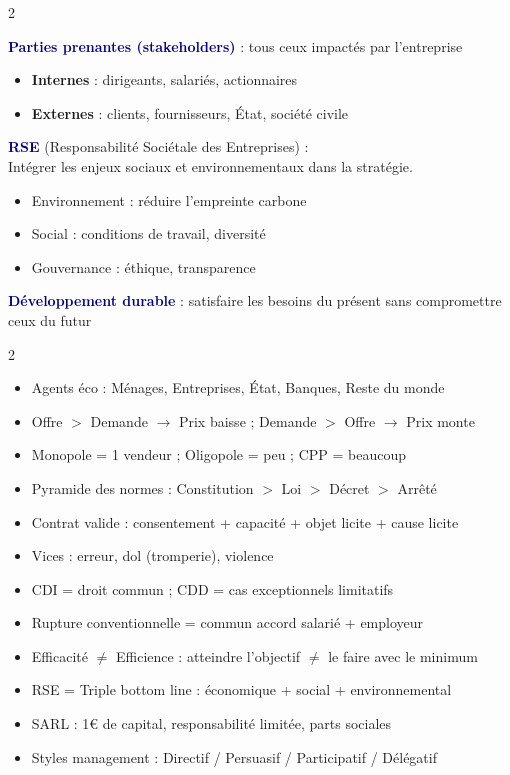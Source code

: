 \documentclass[a4paper,10pt]{article}
\newcommand{\key}[1]{\textbf{\textcolor{darkblue}{#1}}}
\begin{document}
\begin{multicols}{2}
\begin{tcolorbox}[basebox, colframe=purple, title=10. MANAGEMENT — Parties prenantes et RSE]
\key{Parties prenantes (stakeholders)} : tous ceux impactés par l'entreprise
\begin{itemize}
  \item \textbf{Internes} : dirigeants, salariés, actionnaires
  \item \textbf{Externes} : clients, fournisseurs, État, société civile
\end{itemize}
\vspace{4pt}
\key{RSE} (Responsabilité Sociétale des Entreprises) :\\
Intégrer les enjeux sociaux et environnementaux dans la stratégie.
\begin{itemize}
  \item Environnement : réduire l'empreinte carbone
  \item Social : conditions de travail, diversité
  \item Gouvernance : éthique, transparence
\end{itemize}
\vspace{4pt}
\key{Développement durable} : satisfaire les besoins du présent sans compromettre ceux du futur
\end{tcolorbox}

\end{multicols}

\vspace{4pt}
\begin{tcolorbox}[basebox, colframe=darkblue, title=Points clés à retenir pour l'examen CEJM]
\begin{multicols}{2}
\begin{itemize}
  \item Agents éco : Ménages, Entreprises, État, Banques, Reste du monde
  \item Offre $>$ Demande $\to$ Prix baisse ; Demande $>$ Offre $\to$ Prix monte
  \item Monopole = 1 vendeur ; Oligopole = peu ; CPP = beaucoup
  \item Pyramide des normes : Constitution $>$ Loi $>$ Décret $>$ Arrêté
  \item Contrat valide : consentement + capacité + objet licite + cause licite
  \item Vices : erreur, dol (tromperie), violence
  \item CDI = droit commun ; CDD = cas exceptionnels limitatifs
  \item Rupture conventionnelle = commun accord salarié + employeur
  \item Efficacité $\neq$ Efficience : atteindre l'objectif $\neq$ le faire avec le minimum
  \item RSE = Triple bottom line : économique + social + environnemental
  \item SARL : 1€ de capital, responsabilité limitée, parts sociales
  \item Styles management : Directif / Persuasif / Participatif / Délégatif
\end{itemize}
\end{multicols}
\end{tcolorbox}
\end{document}
